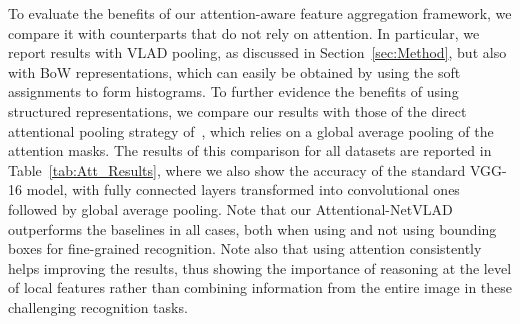 \documentclass{bmvc2k}
\begin{document}
To evaluate the benefits of our attention-aware feature aggregation framework, we compare it with counterparts that do not rely on attention. In particular, we report results with VLAD pooling, as discussed in Section~\ref{sec:Method}, but also with BoW representations, which can easily be obtained by using the soft assignments to form histograms. 
To further evidence the benefits of using structured representations, we compare our results with those of the direct attentional pooling strategy of~\cite{Attpool}, which relies on a global average pooling of the attention masks. The results of this comparison for all datasets are reported in Table~\ref{tab:Att_Results}, where we also show the accuracy of the standard VGG-16 model, with fully connected layers transformed into convolutional ones followed by global average pooling. 
Note that our Attentional-NetVLAD outperforms the baselines in all cases, both when using and not using bounding boxes for fine-grained recognition. Note also that using attention consistently helps improving the results,
thus showing the importance of reasoning at the level of local features rather than combining information from the entire image in these challenging recognition tasks. 
\end{document}
